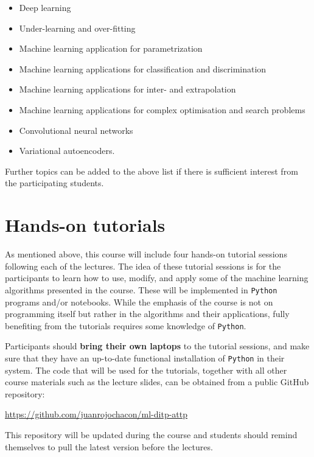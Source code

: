 \documentclass[12pt]{article}
\numberwithin{equation}{section}
\begin{document}
\begin{spacing}{1.1}
\begin{itemize}
\item Deep learning  

\item Under-learning and over-fitting  

\item Machine learning application for parametrization 

\item Machine learning applications for classification and discrimination

\item Machine learning applications for inter- and extrapolation
  
\item Machine learning applications for complex optimisation and search problems

\item Convolutional neural networks

\item Variational autoencoders.
  
\end{itemize}
  
Further topics can be added to the above list if there is sufficient
interest from the participating students.

\section{Hands-on tutorials}

As mentioned above,
this course will include four hands-on tutorial sessions following each
of the lectures.
%
The idea of these tutorial
sessions is for the participants to learn how to use, modify, and apply
some of the machine learning algorithms presented in the course.
%
These will be implemented in {\tt Python} programs and/or notebooks.
%
While the emphasis of the course is not on programming itself but rather
in the algorithms and their applications, fully benefiting from the tutorials
requires some knowledge of {\tt Python}.


Participants should  {\bf bring their own laptops} to the tutorial sessions,
and make sure that they have an up-to-date functional installation of {\tt Python}
in their system.
%
The code that will be used for the tutorials, together with all other course
materials such as the lecture slides, can be obtained from a public GitHub
repository:
\begin{center}
  \url{https://github.com/juanrojochacon/ml-ditp-attp}
\end{center}
This repository will be updated during the course and students should remind
themselves to
pull the latest version before the lectures.


\end{spacing}
\end{document}
